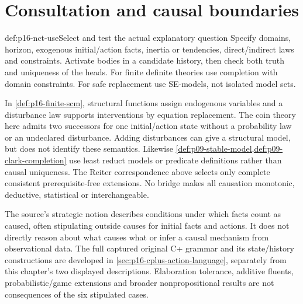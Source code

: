 \section{Consultation and causal boundaries}
\label{sec:p16-nct-use}

\begin{hbmethod}{def:p16-nct-use}{Select and test the actual explanatory question}
Specify domains, horizon, exogenous initial/action facts, inertia or tendencies,
direct/indirect laws and constraints.
Activate bodies in a candidate history, then check both truth and uniqueness
of the heads. For finite definite theories use completion with domain
constraints. For safe replacement use SE-models, not isolated model sets.

In \cref{def:p16-finite-scm}, structural functions assign endogenous variables
and a disturbance law supports interventions by equation replacement.
The coin theory here admits two successors for one initial/action state
without a probability law or an undeclared disturbance. Adding disturbances
can give a structural model, but does not identify these semantics.
Likewise \cref{def:p09-stable-model,def:p09-clark-completion} use least
reduct models or predicate definitions rather than causal uniqueness.
The Reiter correspondence above selects only complete consistent
prerequisite-free extensions. No bridge makes all causation monotonic,
deductive, statistical or interchangeable.
\end{hbmethod}

The source's strategic notion describes conditions under which facts count
as caused, often stipulating outside causes for initial facts and actions.
It does not directly reason about what causes what or infer a causal
mechanism from observational data.
The full captured original C+ grammar and its state/history constructions
are developed in \cref{sec:p16-cplus-action-language}, separately from
this chapter's two displayed descriptions. Elaboration tolerance, additive
fluents, probabilistic/game extensions and broader nonpropositional results
are not consequences of the six stipulated cases.
